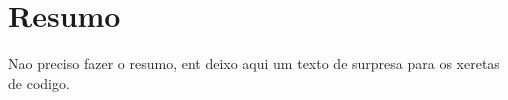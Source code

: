 \section*{Resumo}
Nao preciso fazer o resumo, ent deixo aqui um texto de surpresa para os xeretas de codigo.